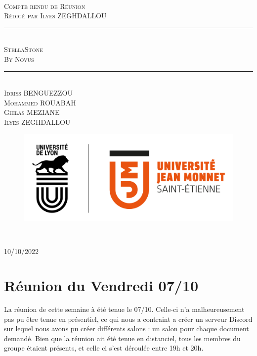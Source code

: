 \documentclass[a4paper, 12pt]{article}
\newcommand{\HRule}{\rule{\linewidth}{0.5mm}}
\begin{document}
\begin{titlepage}
  \begin{sffamily}
  \begin{center}

   
    \textsc{\LARGE }\\[2cm]

    \textsc{\Large Compte rendu de Réunion}\\[1.5cm]
    \textsc{\Medium Rédigé par Ilyes ZEGHDALLOU}

    \HRule \\[0.4cm]
    { \huge  \textsc{ StellaStone} \\
    \textsc{\Large By Novus}\\ [0.4cm] }
	

    \HRule \\[2cm]
    \textsc {Idriss BENGUEZZOU\\Mohammed ROUABAH\\Ghilas MEZIANE \\ Ilyes ZEGHDALLOU}
 \begin{figure}
     \centering
    \includegraphics[scale=0.2]{logoUJM.png}
     \label{fig:ujm_logo}
 \end{figure}
   
    \

    \vfill

    {\large {} 10/10/2022}

  \end{center}
  \end{sffamily}
\end{titlepage}

\newpage

\section{Réunion du Vendredi 07/10}
La réunion de cette semaine à été tenue le 07/10. Celle-ci n'a malheureusement pas pu être tenue en présentiel, ce qui nous a contraint a créer un serveur Discord sur lequel nous avons pu créer différents salons : un salon pour chaque document demandé. Bien que la réunion ait été tenue en distanciel, tous les membres du groupe étaient 
présents, et celle ci s'est déroulée entre 19h et 20h.
\end{document}
